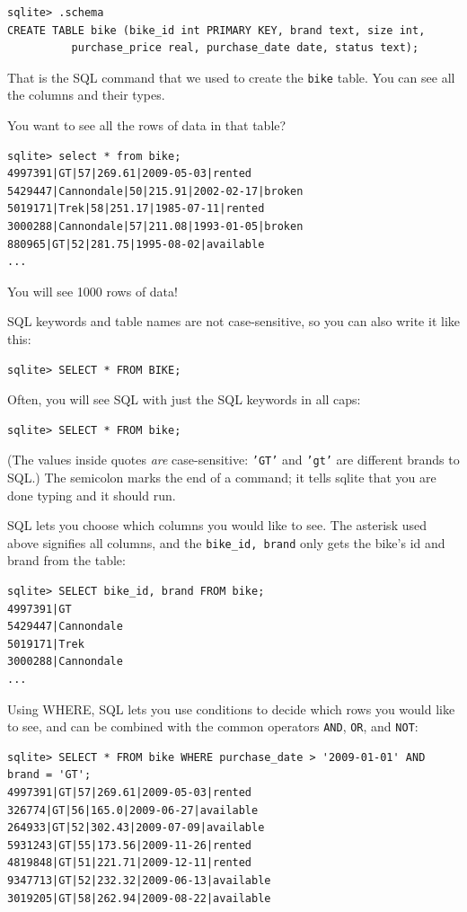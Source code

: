\begin{verbatim}
sqlite> .schema
CREATE TABLE bike (bike_id int PRIMARY KEY, brand text, size int,
          purchase_price real, purchase_date date, status text);
\end{verbatim}

That is the SQL command that we used to create the \texttt{bike}
table. You can see all the columns and their types.

You want to see all the rows of data in that table?

\begin{verbatim}
sqlite> select * from bike;
4997391|GT|57|269.61|2009-05-03|rented
5429447|Cannondale|50|215.91|2002-02-17|broken
5019171|Trek|58|251.17|1985-07-11|rented
3000288|Cannondale|57|211.08|1993-01-05|broken
880965|GT|52|281.75|1995-08-02|available
...
\end{verbatim}

You will see 1000 rows of data!

SQL keywords and table names are not case-sensitive, so you can also
write it like this:
\begin{verbatim}
sqlite> SELECT * FROM BIKE;  
\end{verbatim}

Often, you will see SQL with just the SQL keywords in all caps:
\begin{verbatim}
sqlite> SELECT * FROM bike;  
\end{verbatim}
(The values inside quotes \emph{are} case-sensitive: \texttt{'GT'} and
\texttt{'gt'} are different brands to SQL.) The semicolon marks the end of
a command; it tells sqlite that you are done typing and it should run.

SQL lets you choose which columns you would like to see. The asterisk used above signifies all columns, and the \verb|bike_id, brand| only gets the bike's id and brand from the table:
\begin{verbatim}
sqlite> SELECT bike_id, brand FROM bike;
4997391|GT
5429447|Cannondale
5019171|Trek
3000288|Cannondale
...
\end{verbatim}

Using WHERE, SQL lets you use conditions to decide which rows you would like to see, and can be combined with the common operators \verb|AND|, \verb|OR|, and \verb|NOT|:
\begin{verbatim}
sqlite> SELECT * FROM bike WHERE purchase_date > '2009-01-01' AND brand = 'GT';
4997391|GT|57|269.61|2009-05-03|rented
326774|GT|56|165.0|2009-06-27|available
264933|GT|52|302.43|2009-07-09|available
5931243|GT|55|173.56|2009-11-26|rented
4819848|GT|51|221.71|2009-12-11|rented
9347713|GT|52|232.32|2009-06-13|available
3019205|GT|58|262.94|2009-08-22|available  
\end{verbatim}

